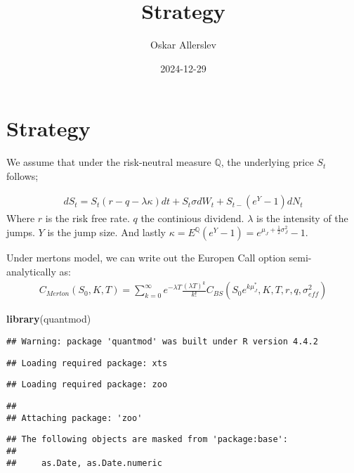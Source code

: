 \documentclass[
]{article}
\title{Strategy}
\author{Oskar Allerslev}
\date{2024-12-29}
\newenvironment{Shaded}{\begin{snugshade}}{\end{snugshade}}
\newcommand{\FunctionTok}[1]{\textcolor[rgb]{0.13,0.29,0.53}{\textbf{#1}}}
\newcommand{\NormalTok}[1]{#1}
\begin{document}
\maketitle

\section{Strategy}\label{strategy}

We assume that under the risk-neutral measure \(\mathbb{Q}\), the
underlying price \(S_t\) follows;

\[
\begin{align*}
dS_t = S_t(r-q-\lambda \kappa)dt + S_t \sigma dW_t + S_{t-}(e^Y-1)dN_t
\end{align*}
\] Where \(r\) is the risk free rate. \(q\) the continious dividend.
\(\lambda\) is the intensity of the jumps. \(Y\) is the jump size. And
lastly
\(\kappa = E^{\mathbb{Q}}(e^Y-1)=e^{\mu_J +\frac{1}{2}\sigma_J^2}-1\).

Under mertons model, we can write out the Europen Call option
semi-analytically as: \[
\begin{align*}
C_{Merton}(S_0,K,T)=\sum_{k=0}^\infty e^{-\lambda T} \frac{(\lambda T)^k}{k!}C_{BS}(S_0 e^{k\mu_J^*}, K, T, r,q, \sigma_{eff}^2)
\end{align*}
\]

\begin{Shaded}
\begin{Highlighting}[]
\FunctionTok{library}\NormalTok{(quantmod)}
\end{Highlighting}
\end{Shaded}

\begin{verbatim}
## Warning: package 'quantmod' was built under R version 4.4.2
\end{verbatim}

\begin{verbatim}
## Loading required package: xts
\end{verbatim}

\begin{verbatim}
## Loading required package: zoo
\end{verbatim}

\begin{verbatim}
## 
## Attaching package: 'zoo'
\end{verbatim}

\begin{verbatim}
## The following objects are masked from 'package:base':
## 
##     as.Date, as.Date.numeric
\end{verbatim}
\end{document}
